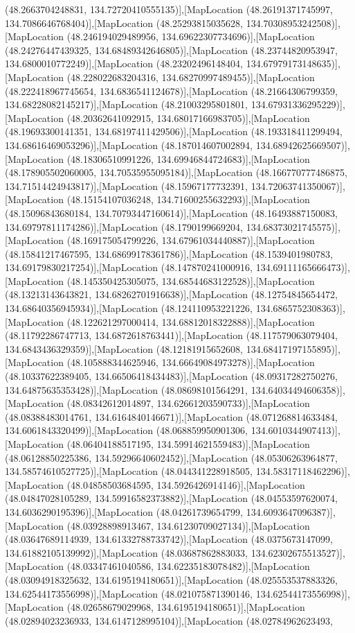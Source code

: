 (48.2663704248831, 134.72720410555135)],[MapLocation (48.26191371745997, 134.7086646768404)],[MapLocation (48.25293815035628, 134.70308953242508)],[MapLocation (48.246194029489956, 134.69622307734696)],[MapLocation (48.24276447439325, 134.68489342646805)],[MapLocation (48.23744820953947, 134.6800010772249)],[MapLocation (48.23202496148404, 134.67979173148635)],[MapLocation (48.228022683204316, 134.68270997489455)],[MapLocation (48.222418967745654, 134.6836541124678)],[MapLocation (48.21664306799359, 134.68228082145217)],[MapLocation (48.21003295801801, 134.67931336295229)],[MapLocation (48.20362641092915, 134.68017166983705)],[MapLocation (48.19693300141351, 134.68197411429506)],[MapLocation (48.193318411299494, 134.68616469053296)],[MapLocation (48.187014607002894, 134.68942625669507)],[MapLocation (48.18306510991226, 134.69946844724683)],[MapLocation (48.178905502060005, 134.70535955095184)],[MapLocation (48.166770777486875, 134.71514424943817)],[MapLocation (48.15967177732391, 134.72063741350067)],[MapLocation (48.15154107036248, 134.71600255632293)],[MapLocation (48.15096843680184, 134.70793447160614)],[MapLocation (48.16493887150083, 134.69797811174286)],[MapLocation (48.1790199669204, 134.68373021745575)],[MapLocation (48.169175054799226, 134.67961034440887)],[MapLocation (48.15841217467595, 134.68699178361786)],[MapLocation (48.1539401980783, 134.69179830217254)],[MapLocation (48.147870241000916, 134.69111165666473)],[MapLocation (48.145350425305075, 134.68544683122528)],[MapLocation (48.13213143643821, 134.68262701916638)],[MapLocation (48.12754845654472, 134.68640356945934)],[MapLocation (48.124110953221226, 134.6865752308363)],[MapLocation (48.122621297000414, 134.68812018322888)],[MapLocation (48.11792286747713, 134.6872618763441)],[MapLocation (48.117579063079404, 134.6843436329359)],[MapLocation (48.12181915652608, 134.68417197155895)],[MapLocation (48.105888344625946, 134.66649084973278)],[MapLocation (48.10337622389405, 134.66506418434483)],[MapLocation (48.09317282750276, 134.64875635353428)],[MapLocation (48.08698101564291, 134.64034494606358)],[MapLocation (48.08342612014897, 134.62661203590733)],[MapLocation (48.08388483014761, 134.6164840146671)],[MapLocation (48.071268814633484, 134.6061843320499)],[MapLocation (48.068859950901306, 134.6010344907413)],[MapLocation (48.06404188517195, 134.59914621559483)],[MapLocation (48.06128850225386, 134.59296640602452)],[MapLocation (48.05306263964877, 134.58574610527725)],[MapLocation (48.044341228918505, 134.58317118462296)],[MapLocation (48.04858503684595, 134.5926426914146)],[MapLocation (48.04847028105289, 134.59916582373882)],[MapLocation (48.04553597620074, 134.6036290195396)],[MapLocation (48.04261739654799, 134.6093647096387)],[MapLocation (48.03928898913467, 134.61230709027134)],[MapLocation (48.03647689114939, 134.61332788733742)],[MapLocation (48.0375673147099, 134.61882105139992)],[MapLocation (48.03687862883033, 134.62302675513527)],[MapLocation (48.03347461040586, 134.62235183078482)],[MapLocation (48.03094918325632, 134.6195194180651)],[MapLocation (48.025553537883326, 134.62544173556998)],[MapLocation (48.021075871390146, 134.62544173556998)],[MapLocation (48.02658679029968, 134.6195194180651)],[MapLocation (48.02894023236933, 134.6147128995104)],[MapLocation (48.02784962623493, 